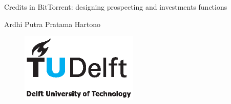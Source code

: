 \begin{titlepage}

\null\vfill

\begin{center}
\LARGE{Credits in BitTorrent: designing prospecting and investments functions}
\end{center}

\vspace{1.5cm}

\begin{center}
Ardhi Putra Pratama Hartono
\end{center}

\vfill

\begin{figure}[!b]
\centering
\includegraphics[width={0.5\textwidth}]{pics/TUDlogocolor}
\end{figure}
\vspace{2.0cm}

\end{titlepage}

